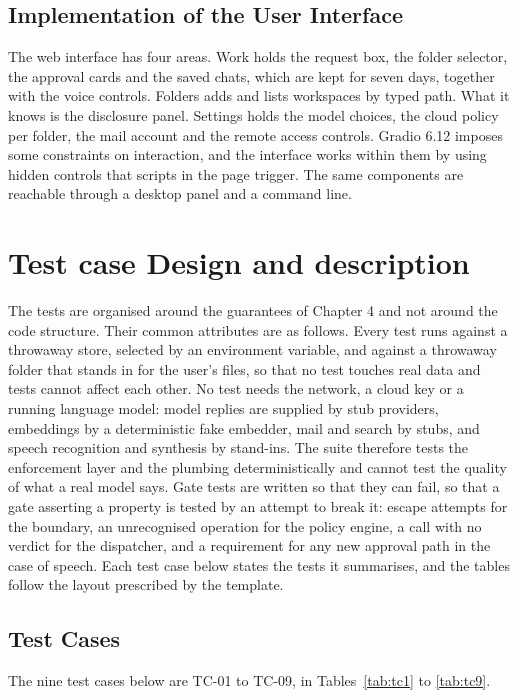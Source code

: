 \documentclass{FastFyp}
\begin{document}
\subsection{Implementation of the User Interface}
The web interface has four areas. Work holds the request box, the folder selector, the approval cards and the saved chats, which are kept for seven days, together with the voice controls. Folders adds and lists workspaces by typed path. What it knows is the disclosure panel. Settings holds the model choices, the cloud policy per folder, the mail account and the remote access controls. Gradio 6.12 imposes some constraints on interaction, and the interface works within them by using hidden controls that scripts in the page trigger. The same components are reachable through a desktop panel and a command line.

\section{Test case Design and description}
The tests are organised around the guarantees of Chapter 4 and not around the code structure. Their common attributes are as follows. Every test runs against a throwaway store, selected by an environment variable, and against a throwaway folder that stands in for the user's files, so that no test touches real data and tests cannot affect each other. No test needs the network, a cloud key or a running language model: model replies are supplied by stub providers, embeddings by a deterministic fake embedder, mail and search by stubs, and speech recognition and synthesis by stand-ins. The suite therefore tests the enforcement layer and the plumbing deterministically and cannot test the quality of what a real model says. Gate tests are written so that they can fail, so that a gate asserting a property is tested by an attempt to break it: escape attempts for the boundary, an unrecognised operation for the policy engine, a call with no verdict for the dispatcher, and a requirement for any new approval path in the case of speech. Each test case below states the tests it summarises, and the tables follow the layout prescribed by the template.

\subsection{Test Cases}
The nine test cases below are TC-01 to TC-09, in Tables~\ref{tab:tc1} to \ref{tab:tc9}.
\end{document}
